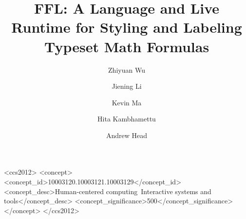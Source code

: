 \documentclass[anonymous,sigconf,review]{acmart}
\begin{document}
\title[FFL: Live Styling and Labeling of Typeset Math Formulas]{FFL: A Language and Live Runtime for Styling and Labeling Typeset Math Formulas}



\begin{abstract}

\end{abstract}



\author{Zhiyuan Wu}
\author{Jiening Li}
\author{Kevin Ma}
\author{Hita Kambhamettu}
\author{Andrew Head}

\renewcommand{\shortauthors}{Wu et al.}

\begin{CCSXML}
<ccs2012>
   <concept>
       <concept_id>10003120.10003121.10003129</concept_id>
       <concept_desc>Human-centered computing~Interactive systems and tools</concept_desc>
       <concept_significance>500</concept_significance>
       </concept>
 </ccs2012>
\end{CCSXML}
\end{document}
